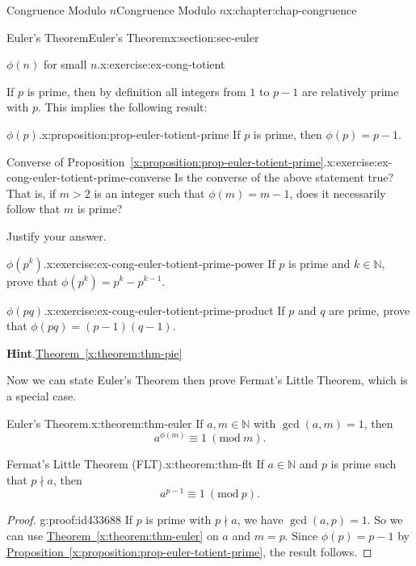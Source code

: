 \documentclass[oneside,10pt,]{book}
\newcommand{\blocktitlefont}{\relax}
\newcommand{\xreffont}{\relax}
\numberwithin{equation}{section}
\newcommand{\Mod}[1]{\ \left(\mathrm{mod}\ #1\right)}
\newcommand{\gt}{>}
\begin{document}
\begin{chapterptx}{Congruence Modulo \(n\)}{}{Congruence Modulo \(n\)}{}{}{x:chapter:chap-congruence}
\begin{sectionptx}{Euler's Theorem}{}{Euler's Theorem}{}{}{x:section:sec-euler}
\begin{inlineexercise}{\(\phi(n)\) for small \(n\).}{x:exercise:ex-cong-totient}
\end{inlineexercise}
If \(p\) is prime, then by definition all integers from \(1\) to \(p-1\) are relatively prime with \(p\). This implies the following result:%
\begin{proposition}{\(\phi(p)\).}{}{x:proposition:prop-euler-totient-prime}%
If \(p\) is prime, then \(\phi(p) = p-1\).%
\end{proposition}
\begin{inlineexercise}{Converse of Proposition~{\xreffont\ref*{x:proposition:prop-euler-totient-prime}}.}{x:exercise:ex-cong-euler-totient-prime-converse}%
Is the converse of the above statement true? That is, if \(m \gt 2\) is an integer such that \(\phi(m) = m-1\), does it necessarily follow that \(m\) is prime?%
\par
Justify your answer.%
\end{inlineexercise}
\begin{inlineexercise}{\(\phi(p^k)\).}{x:exercise:ex-cong-euler-totient-prime-power}%
If \(p\) is prime and \(k \in \mathbb{N}\), prove that \(\phi(p^k) = p^k - p^{k-1}\).%
\end{inlineexercise}
\begin{inlineexercise}{\(\phi(pq)\).}{x:exercise:ex-cong-euler-totient-prime-product}%
If \(p\) and \(q\) are prime, prove that \(\phi(pq) = (p-1)(q-1)\).%
\par\smallskip%
\noindent\textbf{\blocktitlefont Hint}.\hypertarget{g:hint:id435476}{}\quad{}\hyperref[x:theorem:thm-pie]{Theorem~{\xreffont\ref{x:theorem:thm-pie}}}%
\end{inlineexercise}
Now we can state Euler's Theorem then prove Fermat's Little Theorem, which is a special case.%
\begin{theorem}{Euler's Theorem.}{}{x:theorem:thm-euler}%
If \(a, m \in \mathbb{N}\) with \(\gcd(a,m) = 1\), then%
\begin{equation*}
a^{\phi(m)} \equiv 1 \Mod{m}\text{.}
\end{equation*}
%
\end{theorem}
\begin{theorem}{Fermat's Little Theorem (FLT).}{}{x:theorem:thm-flt}%
If \(a \in \mathbb{N}\) and \(p\) is prime such that \(p \nmid a\), then%
\begin{equation*}
a^{p-1} \equiv 1 \Mod{p}\text{.}
\end{equation*}
%
\end{theorem}
\begin{proof}{}{g:proof:id433688}
If \(p\) is prime with \(p \nmid a\), we have \(\gcd(a,p) = 1\). So we can use \hyperref[x:theorem:thm-euler]{Theorem~{\xreffont\ref{x:theorem:thm-euler}}} on \(a\) and \(m = p\). Since \(\phi(p) = p-1\) by \hyperref[x:proposition:prop-euler-totient-prime]{Proposition~{\xreffont\ref{x:proposition:prop-euler-totient-prime}}}, the result follows.%

\end{proof}
\end{sectionptx}
\end{chapterptx}
\end{document}
